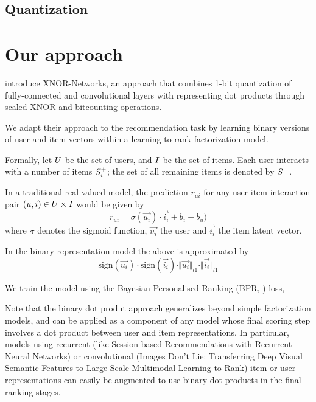 \documentclass[sigconf]{acmart}
\begin{document}
\subsection{Quantization}


\section{Our approach}
\cite{rastegari2016xnor} introduce XNOR-Networks, an approach that combines 1-bit quantization of fully-connected and convolutional layers with representing dot products through scaled XNOR and bitcounting operations.

We adapt their approach to the recommendation task by learning binary versions of user and item vectors within a learning-to-rank factorization model.

Formally, let $U$ be the set of users, and $I$ be the set of items. Each user interacts with a number of items $S_i^+$; the set of all remaining items is denoted by $S^-$.

In a traditional real-valued model, the prediction $r_{ui}$ for any user-item interaction pair $(u, i) \in U \times I$ would be given by
\begin{equation}
r_{ui} = \sigma(\vec{u_i}) \cdot \vec{i_i} + b_i + b_u)
\end{equation}
where $\sigma$ denotes the sigmoid function, $\vec{u_i}$ the user and $\vec{i_i}$ the item latent vector.

In the binary representation model the above is approximated by
\begin{equation}
\mathrm{sign}(\vec{u_i}) \cdot \mathrm{sign}(\vec{i_i}) \cdot \Vert\vec{u_i}\Vert_{l1} \cdot \Vert\vec{i_i}\Vert_{l1}
\end{equation}


We train the model using the Bayesian Personalised Ranking (BPR, \cite{rendle2009bpr}) loss,


Note that the binary dot produt approach generalizes beyond simple factorization models, and can be applied as a component of any model whose final scoring step involves a dot product between user and item representations. In particular, models using recurrent (like Session-based Recommendations with Recurrent Neural Networks) or convolutional (Images Don’t Lie: Transferring Deep Visual Semantic
Features to Large-Scale Multimodal Learning to Rank) item or user representations can easily be augmented to use binary dot products in the final ranking stages.
\end{document}
